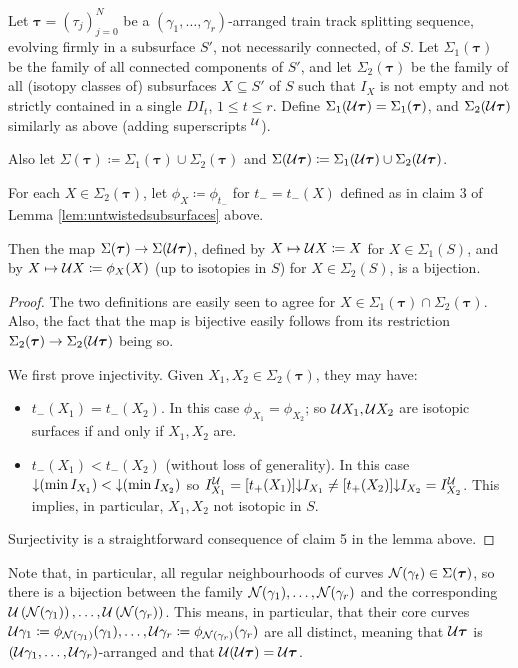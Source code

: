 \begin{coroll}\label{cor:subsurface_bijection}
Let $\bm\tau=(\tau_j)_{j=0}^N$ be a $(\gamma_1,\ldots,\gamma_r)$-arranged train track splitting sequence, evolving firmly in a subsurface $S'$, not necessarily connected, of $S$. Let $\Sigma_1(\bm\tau)$ be the family of all connected components of $S'$, and let $\Sigma_2(\bm\tau)$ be the family of all (isotopy classes of) subsurfaces $X\subseteq S'$ of $S$ such that $I_X$ is not empty and not strictly contained in a single $DI_t$, $1\leq t \leq r$. Define $\Sigma_1({\mathcal U}\bm\tau)=\Sigma_1(\bm\tau)$, and $\Sigma_2({\mathcal U}\bm\tau)$ similarly as above (adding superscripts $^{\mathcal U}$).

Also let $\Sigma(\bm\tau)\coloneqq \Sigma_1(\bm\tau)\cup \Sigma_2(\bm\tau)$ and $\Sigma({\mathcal U}\bm\tau)\coloneqq \Sigma_1({\mathcal U}\bm\tau)\cup \Sigma_2({\mathcal U}\bm\tau)$.

For each $X\in \Sigma_2(\bm\tau)$, let $\phi_X\coloneqq \phi_{t_-}$ for $t_-=t_-(X)$ defined as in claim 3 of Lemma \ref{lem:untwistedsubsurfaces} above.

Then the map $\Sigma(\bm\tau)\rightarrow \Sigma({\mathcal U}\bm\tau)$, defined by $X\mapsto{\mathcal U} X\coloneqq X$ for $X\in \Sigma_1(S)$, and by $X\mapsto {\mathcal U} X\coloneqq \phi_X(X)$ (up to isotopies in $S$) for $X\in\Sigma_2(S)$, is a bijection.
\end{coroll}
\begin{proof}
The two definitions are easily seen to agree for $X\in \Sigma_1(\bm\tau)\cap \Sigma_2(\bm\tau)$. Also, the fact that the map is bijective easily follows from its restriction $\Sigma_2(\bm\tau)\rightarrow\Sigma_2({\mathcal U}\bm\tau)$ being so.

We first prove injectivity. Given $X_1,X_2\in \Sigma_2(\bm\tau)$, they may have:
\begin{itemize}
\item $t_-(X_1)=t_-(X_2)$. In this case $\phi_{X_1}=\phi_{X_2}$; so ${\mathcal U} X_1,{\mathcal U} X_2$ are isotopic surfaces if and only if $X_1,X_2$ are.
\item $t_-(X_1)<t_-(X_2)$ (without loss of generality). In this case $\mathord{\downarrow}(\min I_{X_1})<\mathord{\downarrow}(\min I_{X_2})$ so $I_{X_1}^{\mathcal U}=[t_+(X_1)]\mathord{\downarrow} I_{X_1}\not=[t_+(X_2)]\mathord{\downarrow} I_{X_2}=I_{X_2}^{\mathcal U}$. This implies, in particular, $X_1,X_2$ not isotopic in $S$.
\end{itemize}

Surjectivity is a straightforward consequence of claim 5 in the lemma above.
\end{proof}

Note that, in particular, all regular neighbourhoods of curves ${\mathcal N}(\gamma_t)\in \Sigma(\bm\tau)$, so there is a bijection between the family ${\mathcal N}(\gamma_1),\ldots, {\mathcal N}(\gamma_r)$ and the corresponding ${\mathcal U}\left({\mathcal N}(\gamma_1)\right),\ldots, {\mathcal U}\left({\mathcal N}(\gamma_r)\right)$. This means, in particular, that their core curves ${\mathcal U}\gamma_1\coloneqq \phi_{{\mathcal N}(\gamma_1)}(\gamma_1),\ldots, {\mathcal U}\gamma_r\coloneqq \phi_{{\mathcal N}(\gamma_r)}(\gamma_r)$ are all distinct, meaning that ${\mathcal U}\bm\tau$ is $({\mathcal U}\gamma_1,\ldots,{\mathcal U}\gamma_r)$-arranged and that ${\mathcal U}({\mathcal U}\bm\tau)={\mathcal U}\bm\tau$.


